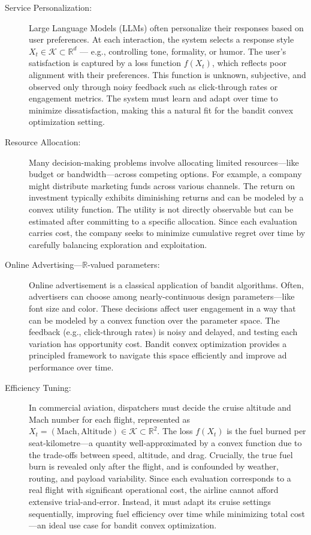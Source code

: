 \documentclass[letter, 12pt]{report}
\newcommand{\R}{\mathbb R}
\newcommand{\cK}{\mathcal K}
\newcommand{\1}{\mathbf{1}}
\theoremstyle{plain}
\theoremstyle{definition}
\theoremstyle{remark}
\begin{document}
\begin{description}
    \item[\textcolor{dkblue}{Service Personalization:}]
          Large Language Models (LLMs) often personalize their responses based on user preferences.
          At each interaction, the system selects a response style \(X_t \in \cK \subset \R^d\) — e.g., controlling tone, formality, or humor.
          The user’s satisfaction is captured by a loss function \(f(X_t)\), which reflects poor alignment with their preferences.
          This function is unknown, subjective, and observed only through noisy feedback such as click-through rates or engagement metrics.
          The system must learn and adapt over time to minimize dissatisfaction, making this a natural fit for the bandit convex optimization setting.

    \item[\textcolor{dkblue}{Resource Allocation:}]
          Many decision-making problems involve allocating limited resources—like budget or bandwidth—across competing options.
          For example, a company might distribute marketing funds across various channels.
          The return on investment typically exhibits diminishing returns and can be modeled by a convex utility function.
          The utility is not directly observable but can be estimated after committing to a specific allocation.
          Since each evaluation carries cost, the company seeks to minimize cumulative regret over time by carefully balancing exploration and exploitation.

    \item[\textcolor{dkblue}{Online Advertising---$\R$-valued parameters:}]
          Online advertisement is a classical application of bandit algorithms.
          Often, advertisers can choose among nearly-continuous design parameters—like font size and color.
          These decisions affect user engagement in a way that can be modeled by a convex function over the parameter space.
          The feedback (e.g., click-through rates) is noisy and delayed, and testing each variation has opportunity cost.
          Bandit convex optimization provides a principled framework to navigate this space efficiently and improve ad performance over time.

    \item[\textcolor{dkblue}{Efficiency Tuning:}]
          In commercial aviation, dispatchers must decide the cruise altitude and Mach number for each flight, represented as \(X_t = (\text{Mach}, \text{Altitude}) \in \cK \subset \R^2\).
          The loss \(f(X_t)\) is the fuel burned per seat-kilometre—a quantity well-approximated by a convex function due to the trade-offs between speed, altitude, and drag.
          Crucially, the true fuel burn is revealed only after the flight, and is confounded by weather, routing, and payload variability.
          Since each evaluation corresponds to a real flight with significant operational cost, the airline cannot afford extensive trial-and-error.
          Instead, it must adapt its cruise settings sequentially, improving fuel efficiency over time while minimizing total cost—an ideal use case for bandit convex optimization.
\end{description}
\end{document}
